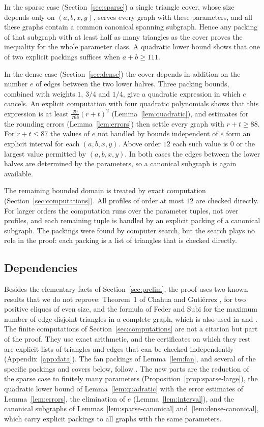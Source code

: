 \documentclass{amsart}
\theoremstyle{definition}
\numberwithin{equation}{section}
\numberwithin{table}{section}
\begin{document}
In the sparse case (Section~\ref{sec:sparse}) a single triangle cover, whose size depends only on $(a,b,x,y)$, serves every graph with these parameters, and all these graphs contain a common canonical spanning subgraph. Hence any packing of that subgraph with at least half as many triangles as the cover proves the inequality for the whole parameter class. A quadratic lower bound shows that one of two explicit packings suffices when $a+b\ge 111$.

In the dense case (Section~\ref{sec:dense}) the cover depends in addition on the number $e$ of edges between the two lower halves. Three packing bounds, combined with weights $1$, $3/4$ and $1/4$, give a quadratic expression in which $e$ cancels. An explicit computation with four quadratic polynomials shows that this expression is at least $\frac{29}{768}(r+t)^2$ (Lemma~\ref{lem:quadratic}), and estimates for the rounding errors (Lemma~\ref{lem:errors}) then settle every graph with $r+t\ge 88$. For $r+t\le 87$ the values of $e$ not handled by bounds independent of $e$ form an explicit interval for each $(a,b,x,y)$. Above order $12$ each such value is $0$ or the largest value permitted by $(a,b,x,y)$. In both cases the edges between the lower halves are determined by the parameters, so a canonical subgraph is again available.

The remaining bounded domain is treated by exact computation (Section~\ref{sec:computations}). All profiles of order at most $12$ are checked directly. For larger orders the computation runs over the parameter tuples, not over profiles, and each remaining tuple is handled by an explicit packing of a canonical subgraph. The packings were found by computer search, but the search plays no role in the proof: each packing is a list of triangles that is checked directly.

\subsection*{Dependencies}
Besides the elementary facts of Section~\ref{sec:prelim}, the proof uses two known results that we do not reprove: Theorem~1 of Chahua and Guti\'errez \cite{CG23}, for two positive cliques of even size, and the formula of Feder and Subi \cite[Theorem~2]{FS12} for the maximum number of edge-disjoint triangles in a complete graph, which is also used in \cite[Lemma~6]{BBG22} and \cite[Proposition~2]{CG23}. The finite computations of Section~\ref{sec:computations} are not a citation but part of the proof. They use exact arithmetic, and the certificates on which they rest are explicit lists of triangles and edges that can be checked independently (Appendix~\ref{app:data}). The fan packings of Lemma~\ref{lem:fan}, and several of the specific packings and covers below, follow \cite{BBG22,CG23}. The new parts are the reduction of the sparse case to finitely many parameters (Proposition~\ref{prop:sparse-large}), the quadratic lower bound of Lemma~\ref{lem:quadratic} with the error estimates of Lemma~\ref{lem:errors}, the elimination of $e$ (Lemma~\ref{lem:interval}), and the canonical subgraphs of Lemmas~\ref{lem:sparse-canonical} and~\ref{lem:dense-canonical}, which carry explicit packings to all graphs with the same parameters.
\end{document}
